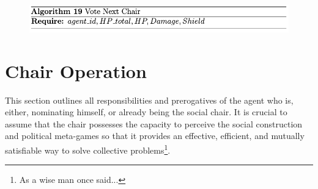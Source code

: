

\begin{figure}[htb]
    \centering
    \includegraphics[scale=0.7]{006_team_3_agent_design/FIGS/Algo19.png}
    \label{fig:algo19}
\end{figure}



\clearpage

\section{Chair Operation}

This section outlines all responsibilities and prerogatives of the agent who is, either, nominating himself, or already being the social chair. It is crucial to assume that the chair possesses the capacity to perceive the social construction and political meta-games so that it provides an effective, efficient, and mutually satisfiable way to solve collective problems\footnote {As a wise man once said...}.

